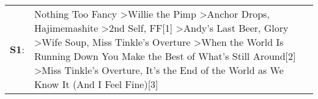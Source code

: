 \begin{supertabular}{p{0.03\textwidth}p{0.92\textwidth}}
 \textbf{S1}:  &  Nothing Too Fancy\textsuperscript{} \textgreater \enspace Willie the Pimp\textsuperscript{} \textgreater \enspace Anchor Drops\textsuperscript{}, \enspace Hajimemashite\textsuperscript{} \textgreater \enspace 2nd Self\textsuperscript{}, \enspace FF[1]\textsuperscript{} \textgreater \enspace Andy's Last Beer\textsuperscript{}, \enspace Glory\textsuperscript{} \textgreater \enspace Wife Soup\textsuperscript{}, \enspace Miss Tinkle's Overture\textsuperscript{} \textgreater \enspace When the World Is Running Down You Make the Best of What's Still Around[2]\textsuperscript{} \textgreater \enspace Miss Tinkle's Overture\textsuperscript{}, \enspace It's the End of the World as We Know It (And I Feel Fine)[3]\textsuperscript{}  \enspace  \\
\end{supertabular}
